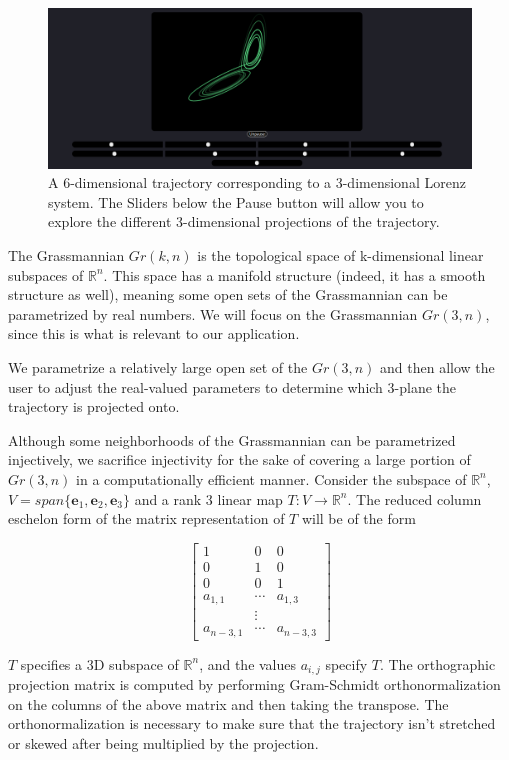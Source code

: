 \documentclass[12pt, openany]{book}
\begin{document}
\begin{figure}
    \includegraphics[width=\linewidth]{latentLorenz.png}
    \caption{A 6-dimensional trajectory corresponding to a 3-dimensional Lorenz system. The Sliders below the Pause button will allow you to explore the different 3-dimensional projections of the trajectory.}
\end{figure}

The Grassmannian $Gr(k,n)$ is the topological space of k-dimensional linear subspaces of $\mathbb{R}^n$. This space has a manifold structure (indeed, it has a smooth structure as well), meaning some open sets of the Grassmannian can be parametrized by real numbers. We will focus on the Grassmannian $Gr(3,n)$, since this is what is relevant to our application.

We parametrize a relatively large open set of the $Gr(3,n)$ and then allow the user to adjust the real-valued parameters to determine which 3-plane the trajectory is projected onto.

Although some neighborhoods of the Grassmannian can be parametrized injectively, we sacrifice injectivity for the sake of covering a large portion of $Gr(3,n)$ in  a computationally efficient manner. Consider the subspace of $\mathbb{R}^n$, $V=span \{\boldsymbol{e}_1,\boldsymbol{e}_2,\boldsymbol{e}_3\}$ and a rank 3 linear map $T:V\rightarrow\mathbb{R}^n$. The reduced column eschelon form of the matrix representation of $T$ will be of the form

$$\begin{bmatrix} 1 & 0 & 0\\ 0 & 1 & 0 \\ 0 & 0 & 1 \\ a_{1,1} & \cdots & a_{1,3} \\ & \vdots & \\ a_{n-3,1} & \cdots & a_{n-3,3} \end{bmatrix}$$

$T$ specifies a 3D subspace of $\mathbb{R}^n$, and the values $a_{i,j}$ specify $T$. The orthographic projection matrix is computed by performing Gram-Schmidt orthonormalization on the columns of the above matrix and then taking the transpose. The orthonormalization is necessary to make sure that the trajectory isn't stretched or skewed after being multiplied by the projection.
\end{document}
